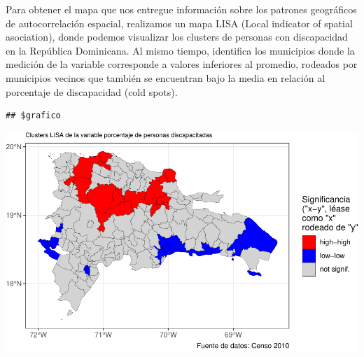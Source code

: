 \documentclass[11pt,]{article}
\begin{document}
Para obtener el mapa que nos entregue información sobre los patrones
geográficos de autocorrelación espacial, realizamos un mapa LISA (Local
indicator of spatial asociation), donde podemos visualizar los clusters
de personas con discapacidad en la República Dominicana. Al mismo
tiempo, identifica los municipios donde la medición de la variable
corresponde a valores inferiores al promedio, rodeados por municipios
vecinos que también se encuentran bajo la media en relación al
porcentaje de discapacidad (cold spots).

\begin{verbatim}
## $grafico
\end{verbatim}

\includegraphics{proyecto_files/figure-latex/unnamed-chunk-9-1.pdf}
\end{document}
